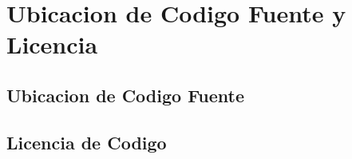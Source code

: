 
\chapter{Ubicacion de Codigo Fuente y Licencia}

\label{AnexoF} 

\section{Ubicacion de Codigo Fuente}

\section{Licencia de Codigo}
